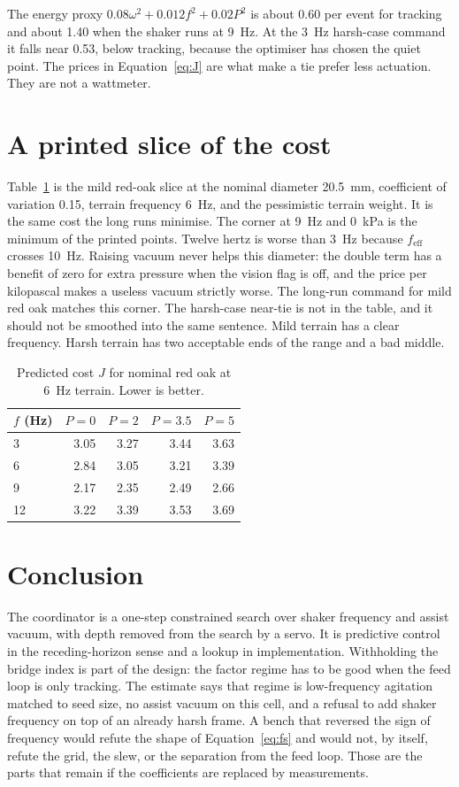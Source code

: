\documentclass[11pt,a4paper]{article}
\begin{document}
The energy proxy $0.08\omega^2+0.012f^2+0.02P^2$ is about 0.60 per event for tracking and about 1.40 when the shaker runs at 9~Hz. At the 3~Hz harsh-case command it falls near 0.53, below tracking, because the optimiser has chosen the quiet point. The prices in Equation~\eqref{eq:J} are what make a tie prefer less actuation. They are not a wattmeter.

\section{A printed slice of the cost}

Table~\ref{tab:grid} is the mild red-oak slice at the nominal diameter 20.5~mm, coefficient of variation 0.15, terrain frequency 6~Hz, and the pessimistic terrain weight. It is the same cost the long runs minimise. The corner at 9~Hz and 0~kPa is the minimum of the printed points. Twelve hertz is worse than 3~Hz because $f_{\mathrm{eff}}$ crosses 10~Hz. Raising vacuum never helps this diameter: the double term has a benefit of zero for extra pressure when the vision flag is off, and the price per kilopascal makes a useless vacuum strictly worse. The long-run command for mild red oak matches this corner. The harsh-case near-tie is not in the table, and it should not be smoothed into the same sentence. Mild terrain has a clear frequency. Harsh terrain has two acceptable ends of the range and a bad middle.

\begin{table}[ht]
\centering
\caption{Predicted cost $J$ for nominal red oak at 6~Hz terrain. Lower is better.}
\label{tab:grid}
\small
\begin{tabular}{@{}lrrrr@{}}
\toprule
$f$ (Hz) & $P=0$ & $P=2$ & $P=3.5$ & $P=5$ \\
\midrule
3 & 3.05 & 3.27 & 3.44 & 3.63 \\
6 & 2.84 & 3.05 & 3.21 & 3.39 \\
9 & 2.17 & 2.35 & 2.49 & 2.66 \\
12 & 3.22 & 3.39 & 3.53 & 3.69 \\
\bottomrule
\end{tabular}
\end{table}

\section{Conclusion}

The coordinator is a one-step constrained search over shaker frequency and assist vacuum, with depth removed from the search by a servo. It is predictive control in the receding-horizon sense and a lookup in implementation. Withholding the bridge index is part of the design: the factor regime has to be good when the feed loop is only tracking. The estimate says that regime is low-frequency agitation matched to seed size, no assist vacuum on this cell, and a refusal to add shaker frequency on top of an already harsh frame. A bench that reversed the sign of frequency would refute the shape of Equation~\eqref{eq:fs} and would not, by itself, refute the grid, the slew, or the separation from the feed loop. Those are the parts that remain if the coefficients are replaced by measurements.
\end{document}
